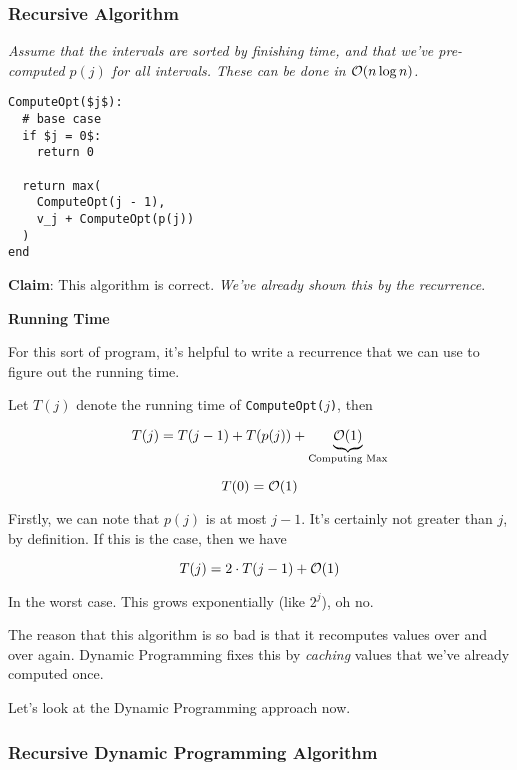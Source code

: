 \documentclass[12pt]{article}
\begin{document}

  \subsubsection{Recursive Algorithm}

  {\it Assume that the intervals are sorted by finishing time, and that we've
  pre-computed $p(j)$ for all intervals. These can be done in $\mathcal O(n \log n)$.}

  \begin{lstlisting}
ComputeOpt($j$):
  # base case
  if $j = 0$:
    return 0

  return max(
    ComputeOpt(j - 1),
    v_j + ComputeOpt(p(j))
  )
end
  \end{lstlisting}

  {\bf Claim}: This algorithm is correct. {\it We've already shown this by the
  recurrence}.

  {\bf Running Time}

  For this sort of program, it's helpful to write a recurrence that we can use
  to figure out the running time.

  Let $T(j)$ denote the running time of \texttt{ComputeOpt($j$)}, then

  \[
    T(j) = T(j - 1) + T(p(j)) + \underbrace{\mathcal O(1)}_\text{Computing Max}
  \]

  \[
    T(0) = \mathcal O(1)
  \]

  Firstly, we can note that $p(j)$ is at most $j - 1$. It's certainly not
  greater than $j$, by definition. If this is the case, then we have

  \[
    T(j) = 2 \cdot T(j - 1) + \mathcal O(1)
  \]

  In the worst case. This grows exponentially (like $2^j$), oh no.

  The reason that this algorithm is so bad is that it recomputes values over and
  over again. Dynamic Programming fixes this by {\it caching} values that we've
  already computed once.

  Let's look at the Dynamic Programming approach now.

  \subsubsection{Recursive Dynamic Programming Algorithm}
  
\end{document}
